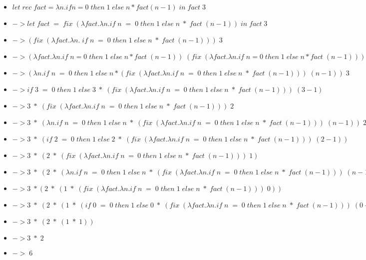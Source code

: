 \documentclass{article}
\theoremstyle{theorem}
\theoremstyle{definition}
\theoremstyle{remark}
\begin{document}
\begin{itemize}
  \item \texttt{$let \; rec \; fact = \lambda n. if n = 0 \; then \; 1 \; else \; n * fact (n-1) \; in \; fact \; 3$}
  \item \texttt{$-> let \; fact \; = \; fix \; (\lambda fact. \lambda n. if \; n \; = \; 0 \; then \; 1 \; else \; n \; * \; fact \; (n-1)) \; in \; fact \; 3$}
  \item \texttt{$-> (fix \;(\lambda fact. \lambda n. \; if \; n \; = \; 0 \; then \;1 \; else \; n \; * \; fact \;(n-1))) \;3$}
  \item \texttt{$-> (\lambda fact. \lambda n. if \; n=0 \; then \;1 \; else \; n*fact \; (n-1)) \; (fix \; (\lambda fact. \lambda n. if \; n=0 \; then \; 1 \; else \; n*fact \; (n-1))) \; 3$}
  \item \texttt{$-> (\lambda n. if \; n \; = \; 0 \; then \; 1 \; else \; n*(fix \; (\lambda fact. \lambda n. if \; n \; = \; 0 \; then \; 1 \; else \; n \; * \; fact \; (n-1))) \; (n-1)) \; 3$}
  \item \texttt{$-> if \; 3 \; = \; 0 \; then \; 1 \; else \; 3 \; * \; (fix \; (\lambda fact. \lambda n. if \; n \; = \; 0 \; then \; 1 \; else \; n \; * \; fact \; (n-1))) \; (3-1)$}
  \item \texttt{$-> 3 \; * \; (fix \; (\lambda fact. \lambda n. if \; n \; = \; 0 \; then \; 1 \; else \; n \; * \; fact \; (n-1))) \; 2$}
  \item \texttt{$-> 3 \; * \; (\lambda n. if \; n \; = \; 0 \; then \; 1 \; else \; n \; * \; (fix \; (\lambda fact. \lambda n. if \; n \; = \; 0 \; then \; 1 \; else \; n \; * \; fact \; (n-1))) \; (n-1)) \; 2$}
  \item \texttt{$-> 3 \; * \; (if \; 2 \; = \; 0 \; then \; 1 \; else \; 2 \; * \; (fix \; (\lambda fact. \lambda n. if \; n \; = \; 0 \; then \; 1 \; else \; n \; * \; fact \; (n-1))) \; (2-1))$}
  \item \texttt{$-> 3 \; * \; (2 \; * \; (fix \; (\lambda fact. \lambda n. if \; n \; = \:0 \; then \; 1 \; else \; n \; * \; fact \; (n-1))) \; 1)$}
  \item \texttt{$-> 3 \; * \; (2 \; * \; (\lambda n. if \; n \; = \; 0 \; then \; 1 \; else \; n \; * \; (fix \; (\lambda fact. \lambda n. if \; n \; = \; 0 \; then \; 1 \; else \; n \; * \; fact \; (n-1))) \; (n-1)) \; 1)$}
  \item \texttt{$-> 3 \; * (2 \; * \; (1 \; * \; (fix \; (\lambda fact. \lambda n. if \; n \; = \; 0 \; then \; 1 \; else \; n \; * \; fact \; (n-1))) \; 0))$}
  \item \texttt{$-> 3 \; * \; (2 \; * \;(1 \; * \; (if \; 0 \; = \; 0 \; then \; 1 \; else \; 0 \; * \; (fix \; (\lambda fact. \lambda n. if \; n \; = \; 0 \; then \; 1 \; else \; n \; * \; fact \; (n-1))) \; (0-1))))$}
  \item \texttt{$-> 3 \; * \; (2 \; * \; (1 \; * \; 1))$}
  \item \texttt{$-> 3 \; * \; 2$}
  \item \texttt{$-> \; 6$}
\end{itemize}
\end{document}
